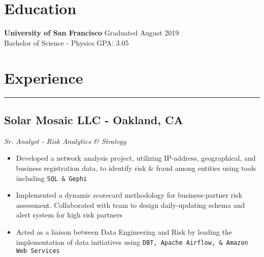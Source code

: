 \documentclass[11pt,a4paper]{article}
\newenvironment{myitemize}
{ \begin{itemize}[label={--}, leftmargin=*]
    \setlength{\itemsep}{0pt}
    \setlength{\parskip}{0pt}
    \setlength{\parsep}{0pt}     }
{ \end{itemize}                  }
\begin{document}
\section*{\\Education}
\vspace{-7mm} %
\noindent\makebox[\linewidth]{\rule{\textwidth}{0.4pt}}
\textbf{University of San Francisco} \hfill Graduated August 2019 \\
Bachelor of Science - Physics \hfill GPA: 3.05



\section*{Experience}
\vspace{-3mm} %
\hrule
\vspace{3mm} %

\subsection*{Solar Mosaic LLC - Oakland, CA \hfill {} }
\vspace{-1.5mm} %
\textit{Sr. Analyst - Risk Analytics \& Strategy}
\vspace{-1.5mm} %
\begin{myitemize}
\item Developed a network analysis project, utilizing IP-address, geographical, and business registration data, to identify risk \& fraud among entities using tools including \texttt{SQL \& Gephi}
\item Implemented a dynamic scorecard methodology for business-partner risk assessment. Collaborated with team to design daily-updating schema and alert system for high risk partners
\item Acted as a liaison between Data Engineering and Risk by leading the implementation of data initiatives using \texttt{DBT, Apache Airflow, \& Amazon Web Services}
\end{myitemize}
\end{document}
